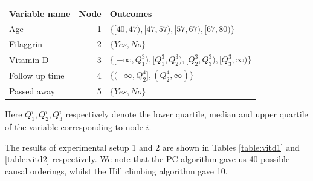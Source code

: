 \documentclass{tufte-book}
\begin{document}
\begin{center}
\begin{tabular}{l|r|l}
\hline
Variable name & Node & Outcomes\\
\hline
Age & 1 & \(\{[40,47),[47,57),[57,67),[67,80)\}\)\\
Filaggrin & 2 & \(\{Yes,No\}\)\\
Vitamin D & 3 & \(\{ [-\infty,Q^3_1),[Q^3_1,Q^3_2),[Q^3_2,Q^3_3),[Q^3_3,\infty) \}\)\\
Follow up time & 4 & \(\{(-\infty, Q^4_2],(Q^4_2, \infty) \}\)\\
Passed away & 5 & \(\{Yes,No \}\)\\
\end{tabular}
\end{center}

Here \(Q^i_1,Q^i_2,Q^i_3\) respectively denote the lower quartile, median and upper quartile of the variable corresponding to node \(i\).

The results of experimental setup 1 and 2 are shown in Tables \ref{table:vitd1} and \ref{table:vitd2} respectively. We note that the PC algorithm gave us 40 possible causal orderings, whilst the Hill climbing algorithm gave 10.
\end{document}
